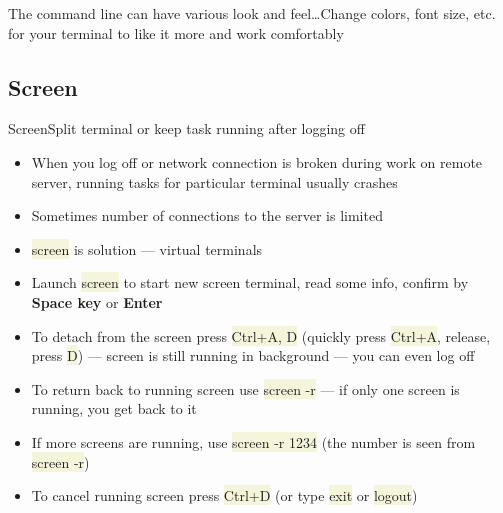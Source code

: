\documentclass[compress, xelatex, 11pt, xcolor=svgnames, aspectratio=169,
	hyperref={
		bookmarks=true,
		unicode=true,
		colorlinks=true,
		pdftitle={Linux, command line and MetaCentrum},
		plainpages=false,
		pdfauthor={Vojtech Zeisek},
		pdfsubject={Course about use of Linux command line, writing shell scripts and using MetaCentrum of CESNET},
		pdfcreator={XeLaTeX},
		pdfkeywords={Linux, GNU, BASH, shell, command line, MetaCentrum},
		linkcolor=DarkRed, %
		anchorcolor=DarkBlue, %
		citecolor=Indigo, %
		filecolor=NavyBlue, %
		menucolor=DarkMagenta, %
		urlcolor=DarkBlue, %
		},
	url={hyphens, lowtilde} %
	]{beamer}
\renewcommand{\texttt}[1]{\colorbox{Beige}{{\ttfamily #1}}}
\begin{document}
\begin{frame}{The command line can have various look and feel\ldots}{Change colors, font size, etc. for your terminal to like it more and work comfortably}
	\begin{center}
		\texttt{[image: terminals.png]}
	\end{center}
\end{frame}

\subsection{Screen}

\begin{frame}{Screen}{Split terminal or keep task running after logging off}
	\begin{itemize}
		\item When you log off or network connection is broken during work on remote server, running tasks for particular terminal usually crashes
		\item Sometimes number of connections to the server is limited
		\item \texttt{screen} is solution --- virtual terminals
		\item Launch \texttt{screen} to start new screen terminal, read some info, confirm by \textbf{Space key} or \textbf{Enter}
		\item To detach from the screen press \texttt{Ctrl+A, D} (quickly press \texttt{Ctrl+A}, release, press \texttt{D}) --- screen is still running in background --- you can even log off
		\item To return back to running screen use \texttt{screen -r} --- if only one screen is running, you get back to it
		\item If more screens are running, use \texttt{screen -r 1234} (the number is seen from \texttt{screen -r})
		\item To cancel running screen press \texttt{Ctrl+D} (or type \texttt{exit} or \texttt{logout})
	\end{itemize}
\end{frame}
\end{document}
